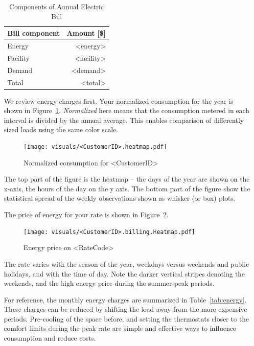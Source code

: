 \documentclass[11pt]{article}
\begin{document}
\begin{table}[th!]
  \centering
  \caption{Components of Annual Electric Bill}
  \vspace{1.5ex}
  \label{tab:annual}
  \begin{tabular}{lr}
    Bill component & Amount [\$] \\
    \midrule
    Energy & <energy> \\
    Facility & <facility> \\
    Demand & <demand> \\
    \midrule
    Total & <total>
  \end{tabular}
\end{table}
\clearpage

\pagestyle{energy}

We review energy charges first.
Your normalized consumption for the year is shown in Figure~\ref{fig:heatmap}.
\emph{Normalized} here means that the consumption metered in each interval is divided by the annual average.
This enables comparison of differently sized loads using the same color scale.
\begin{figure}[!h]
\centering
\texttt{[image: visuals/<CustomerID>.heatmap.pdf]}
\caption{Normalized consumption for <CustomerID>}
\label{fig:heatmap}
\end{figure}

The top part of the figure is the heatmap -- the days of the year are shown on the x-axis, the hours of the day on the y axis.
The bottom part of the figure show the statistical spread of the weekly observations shown as whisker (or box) plots.

The price of energy for your rate is shown in Figure~\ref{fig:toumap}.
\begin{figure}[!h]
\centering
\texttt{[image: visuals/<CustomerID>.billing.Heatmap.pdf]}
\caption{Energy price on <RateCode>}
\label{fig:toumap}
\end{figure}
The rate varies with the season of the year, weekdays versus weekends and public holidays, and with the time of day.
Note the darker vertical stripes denoting the weekends, and the high energy price during the summer-peak periods.

For reference, the monthly energy charges are summarized in Table~\ref{tab:energy}.
These charges can be reduced by shifting the load away from the more expensive periods.
Pre-cooling of the space before, and setting the thermostats closer to the comfort limits during the peak rate are simple and effective ways to influence consumption and reduce costs.
\end{document}
